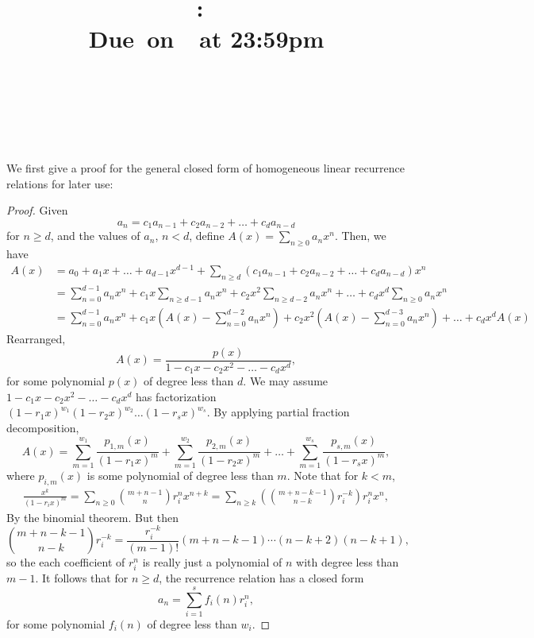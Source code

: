 \documentclass{article}
\title{
    \vspace{2in}
    \textmd{\textbf{\hmwkClass:\ \hmwkTitle}}\\
    \normalsize\vspace{0.1in}\small{Due\ on\ \hmwkDueDate\ at 23:59pm}\\
    \vspace{0.1in}\large{\textit{\hmwkClassInstructor}} \\
    \vspace{3in}
}
\author{
  \hmwkAuthorName \\
  \vspace{0.1in}\small\hmwkPID
}
\date{}
\begin{document}
\maketitle

\pagebreak

We first give a proof for the general closed form of homogeneous linear recurrence relations for later use: 
\begin{proof}
  Given 
  \[
    a_n = c_1a_{n - 1} + c_2a_{n - 2} + \dots + c_da_{n - d}
  \]
  for $n \geq d$, and the values of $a_n$, $n < d$, define $A(x) = \sum\limits_{n \geq 0} a_nx^n$. Then, we have 
  \begin{align*}
    A(x) 
    &= a_0 + a_1x + \dots + a_{d - 1}x^{d - 1} + \sum_{n \geq d} (c_1a_{n - 1} + c_2a_{n - 2} + \dots + c_da_{n - d})x^n \\
    &= \sum_{n = 0}^{d - 1} a_nx^n + c_1x\sum_{n \geq d - 1} a_{n}x^n + c_2x^2\sum_{n \geq d - 2} a_{n}x^n + \dots + c_dx^d\sum_{n \geq 0} a_{n}x^n \\
    &= \sum_{n = 0}^{d - 1} a_nx^n + c_1x\left(A(x) - \sum_{n = 0}^{d - 2} a_nx^n\right) + c_2x^2\left(A(x) - \sum_{n = 0}^{d - 3} a_nx^n\right) + \dots + c_dx^dA(x)
  \end{align*}
  Rearranged,
  \[
    A(x) = \frac{p(x)}{1 - c_1x - c_2x^2 - \dots - c_dx^d},
    \]
  for some polynomial $p(x)$ of degree less than $d$. We may assume $1 - c_1x - c_2x^2 - \dots - c_dx^d$ has factorization $(1 - r_1x)^{w_1}(1 - r_2x)^{w_2} \dots (1 - r_sx)^{w_s}$. By applying partial fraction decomposition,
  \[
    A(x) = \sum_{m = 1}^{w_1} \frac{p_{1, m}(x)}{(1 - r_1x)^m} + \sum_{m = 1}^{w_2} \frac{p_{2, m}(x)}{(1 - r_2x)^m} + \dots + \sum_{m = 1}^{w_s} \frac{p_{s, m}(x)}{(1 - r_sx)^m},
  \]
  where $p_{i, m}(x)$ is some polynomial of degree less than $m$. Note that for $k < m$,
  \begin{gather*}
    \frac{x^k}{(1 - r_ix)^m} = \sum_{n \geq 0} {m + n - 1 \choose n}r_i^nx^{n + k} = \sum_{n \geq k} \left({m + n - k - 1 \choose n - k}r_i^{-k}\right)r_i^{n}x^{n},
  \end{gather*}
  By the binomial theorem. But then
  \[
    {m + n - k - 1 \choose n - k}r_i^{-k} = \frac{r_i^{-k}}{(m - 1)!}(m + n - k - 1) \cdots (n - k + 2)(n - k + 1),
  \]
  so the each coefficient of $r_i^n$ is really just a polynomial of $n$ with degree less than $m - 1$. It follows that for $n \geq d$, the recurrence relation has a closed form 
  \[
    a_n = \sum_{i = 1}^s f_i(n)r_i^n,
  \]
  for some polynomial $f_i(n)$ of degree less than $w_i$.
\end{proof}
\end{document}
